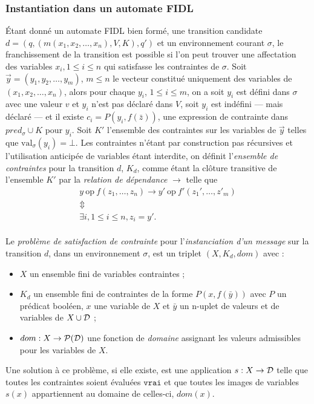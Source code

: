 \subsubsection{Instantiation dans un automate \textsf{FIDL}}
\label{sec:csp-mono}

\'Etant donn\'e un automate \textsf{FIDL} bien form\'e, une transition candidate $d=(q,(m(x_1,x_2,\dots,x_n),V,K),q')$ et un environnement courant
$\sigma$, le franchissement de la transition est possible si l'on peut
trouver une affectation des variables $x_i,
1\leq i\leq n$ qui satisfasse les contraintes de $\sigma$. Soit $\vec{y} = (y_1,y_2,\dots,y_m)$, $m\leq n$ le
vecteur constitu\'e uniquement des variables de
$(x_1,x_2,\dots,x_n)$, alors pour chaque $y_i$, $1\leq i\leq m$, on a soit
$y_i$ est d\'efini dans $\sigma$ avec une valeur $v$ et $y_i$ n'est
pas d\'eclar\'e dans $V$, soit $y_i$ est ind\'efini --- mais
d\'eclar\'e --- et il existe  $c_i = P(y_i,f(\bar{z}))$,
une expression de contrainte dans
$pred_\sigma \cup K$  pour $y_i$. Soit $K'$
l'ensemble des contraintes sur les variables de  $\vec{y}$ telles que $\mathrm{val}_\sigma(y_i) =
\bot$. Les contraintes n'\'etant par construction pas r\'ecursives
et l'utilisation anticip\'ee de variables \'etant interdite, on
d\'efinit l'\emph{ensemble de contraintes}  pour la
transition $d$, $K_d$, comme \'etant la cl\^oture transitive de
l'ensemble $K'$ par la \emph{relation de d\'ependance} $\rightarrow$ telle que
$$
\begin{array}{c}
y \mathrm{~op~} f(z_1,\dots,z_n) \rightarrow y' \mathrm{~op~} f'(z_1',\dots,z'_m) \\
\Updownarrow \\
\exists i, 1\leq i \leq n, z_i = y'.\\
\end{array}
$$

\begin{definition}
Le \emph{probl\`eme de satisfaction de contrainte} pour
  l'\emph{instanciation d'un message} sur la  transition $d$, dans un
  environnement $\sigma$, est un triplet $(X,K_d,dom)$ avec :
  \begin{itemize}
    \item $X$ un ensemble fini de variables contraintes ;
    \item $K_d$ un ensemble fini de contraintes de la forme
    $P(x, f(\bar{y}))$ avec $P$ un pr\'edicat bool\'een, $x$ une
    variable de $X$ et $\bar{y}$ un n-uplet de valeurs et de variables
    de $X\cup {\cal D}$ ;
  \item $dom: X \rightarrow {\cal P}({\cal D})$ une fonction de
  \emph{domaine} assignant les valeurs admissibles pour les variables de $X$.
  \end{itemize}
Une solution \`a ce probl\`eme, si elle existe, est une application  $s:X \rightarrow {\cal
  D}$ telle que toutes les contraintes soient \'evalu\'ees
  $\mathtt{vrai}$ et que toutes les images de variables $s(x)$
  appartiennent au domaine de celles-ci, $dom(x)$.
\end{definition}

